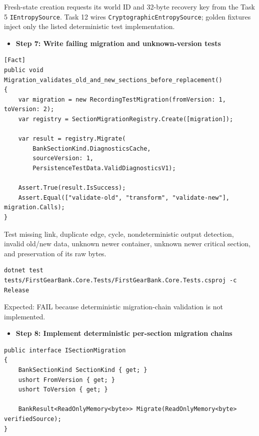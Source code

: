 \documentclass[
  10pt,
  letterpaper,
]{article}
\newcommand{\passthrough}[1]{#1}
\providecommand{\tightlist}{%
  \setlength{\itemsep}{0pt}\setlength{\parskip}{0pt}}
\begin{document}
Fresh-state creation requests its world ID and 32-byte recovery key from
the Task 5 \passthrough{\lstinline!IEntropySource!}. Task 12 wires
\texttt{CryptographicEntropySource}; golden fixtures inject only the
listed deterministic test implementation.

\begin{itemize}
\tightlist
\item[$\square$]
  \textbf{Step 7: Write failing migration and unknown-version tests}
\end{itemize}

\begin{lstlisting}
[Fact]
public void Migration_validates_old_and_new_sections_before_replacement()
{
    var migration = new RecordingTestMigration(fromVersion: 1, toVersion: 2);
    var registry = SectionMigrationRegistry.Create([migration]);

    var result = registry.Migrate(
        BankSectionKind.DiagnosticsCache,
        sourceVersion: 1,
        PersistenceTestData.ValidDiagnosticsV1);

    Assert.True(result.IsSuccess);
    Assert.Equal(["validate-old", "transform", "validate-new"], migration.Calls);
}
\end{lstlisting}

Test missing link, duplicate edge, cycle, nondeterministic output
detection, invalid old/new data, unknown newer container, unknown newer
critical section, and preservation of its raw bytes.

\begin{lstlisting}
dotnet test tests/FirstGearBank.Core.Tests/FirstGearBank.Core.Tests.csproj -c Release
\end{lstlisting}

Expected: FAIL because deterministic migration-chain validation is not
implemented.

\begin{itemize}
\tightlist
\item[$\square$]
  \textbf{Step 8: Implement deterministic per-section migration chains}
\end{itemize}

\begin{lstlisting}
public interface ISectionMigration
{
    BankSectionKind SectionKind { get; }
    ushort FromVersion { get; }
    ushort ToVersion { get; }

    BankResult<ReadOnlyMemory<byte>> Migrate(ReadOnlyMemory<byte> verifiedSource);
}
\end{lstlisting}
\end{document}
